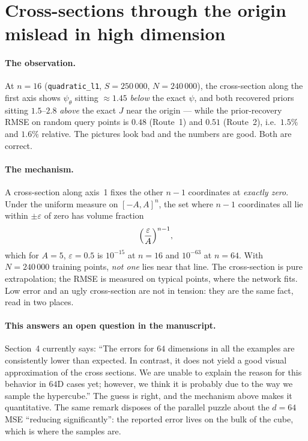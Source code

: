 \documentclass[11pt]{article}
\newcommand{\file}[1]{\texttt{#1}}
\begin{document}
\section{Cross-sections through the origin mislead in high dimension}
\label{sec:crosssec}

\paragraph{The observation.} At $n=16$ (\file{quadratic\_l1}, $S=250\,000$,
$N=240\,000$), the cross-section along the first axis shows $\psi_{\theta}$
sitting $\approx1.45$ \emph{below} the exact $\psi$, and both recovered priors
sitting $1.5$--$2.8$ \emph{above} the exact $J$ near the origin --- while the
prior-recovery RMSE on random query points is $0.48$ (Route~1) and $0.51$
(Route~2), i.e.\ $1.5\%$ and $1.6\%$ relative. The pictures look bad and the
numbers are good. Both are correct.

\paragraph{The mechanism.} A cross-section along axis~1 fixes the other $n-1$
coordinates at \emph{exactly zero}. Under the uniform measure on $[-A,A]^{n}$,
the set where $n-1$ coordinates all lie within $\pm\varepsilon$ of zero has
volume fraction
\[
  \Bigl(\frac{\varepsilon}{A}\Bigr)^{n-1},
\]
which for $A=5$, $\varepsilon=0.5$ is $10^{-15}$ at $n=16$ and $10^{-63}$ at
$n=64$. With $N=240\,000$ training points, \emph{not one} lies near that line.
The cross-section is pure extrapolation; the RMSE is measured on typical points,
where the network fits. Low error and an ugly cross-section are not in tension:
they are the same fact, read in two places.

\paragraph{This answers an open question in the manuscript.} Section~4 currently
says: ``The errors for $64$ dimensions in all the examples are consistently lower
than expected. In contrast, it does not yield a good visual approximation of the
cross sections. We are unable to explain the reason for this behavior in $64$D
cases yet; however, we think it is probably due to the way we sample the
hypercube.'' The guess is right, and the mechanism above makes it quantitative.
The same remark disposes of the parallel puzzle about the $d=64$ MSE
``reducing significantly'': the reported error lives on the bulk of the cube,
which is where the samples are.
\end{document}
